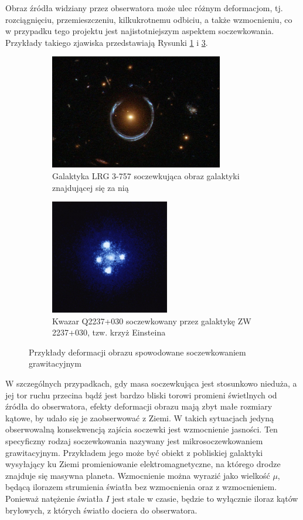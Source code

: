 \documentclass[a4paper,11pt]{article}
\newcommand{\ak}{\hspace{0.7 cm}}
\begin{document}
\ak Obraz źródła widziany przez obserwatora może ulec różnym deformacjom, tj. rozciągnięciu, przemieszczeniu, kilkukrotnemu odbiciu, a także wzmocnieniu, co w przypadku tego projektu jest najistotniejszym aspektem soczewkowania. Przykłady takiego zjawiska przedstawiają Rysunki \ref{Fig_2} i \ref{Fig_3}.
\newpage%
\begin{figure}[h]
\begin{subfigure}{0.5\textwidth}
\centering
\includegraphics[width=0.9\linewidth,height=5cm]{Fig/Horseshoe.jpeg}
\caption{Galaktyka LRG 3-757 soczewkująca obraz galaktyki znajdującej się za nią \citet{Horseshoe}}
\label{Fig_2}
\end{subfigure}
\hspace{0.5cm}
\begin{subfigure}{0.5\textwidth}
\centering
\includegraphics[width=0.9\linewidth,height=5cm]{Fig/Cross.jpeg}
\caption{Kwazar Q2237+030 soczewkowany przez galaktykę ZW 2237+030, tzw. krzyż Einsteina \citet{Cross}}
\label{Fig_3}
\end{subfigure}
\caption{Przykłady deformacji obrazu spowodowane soczewkowaniem grawitacyjnym}
\end{figure}
\ak W szczególnych przypadkach, gdy masa soczewkująca jest stosunkowo nieduża, a jej tor ruchu przecina bądź jest bardzo bliski torowi promieni świetlnych od źródła do obserwatora, efekty deformacji obrazu mają zbyt małe rozmiary kątowe, by udało się je zaobserwować z Ziemi. W takich sytuacjach jedyną obserwowalną konsekwencją zajścia soczewki jest wzmocnienie jasności. Ten specyficzny rodzaj soczewkowania nazywany jest mikrosoczewkowaniem grawitacyjnym. Przykładem jego może być obiekt z pobliskiej galaktyki wysyłający ku Ziemi promieniowanie elektromagnetyczne, na którego drodze znajduje się masywna planeta. Wzmocnienie można wyrazić jako wielkość $\mu$, będącą ilorazem strumienia światła bez wzmocnienia oraz z wzmocnieniem. Ponieważ natężenie światła $I$ jest stałe w czasie, będzie to wyłącznie iloraz kątów bryłowych, z których światło dociera do  obserwatora.\\
\end{document}
